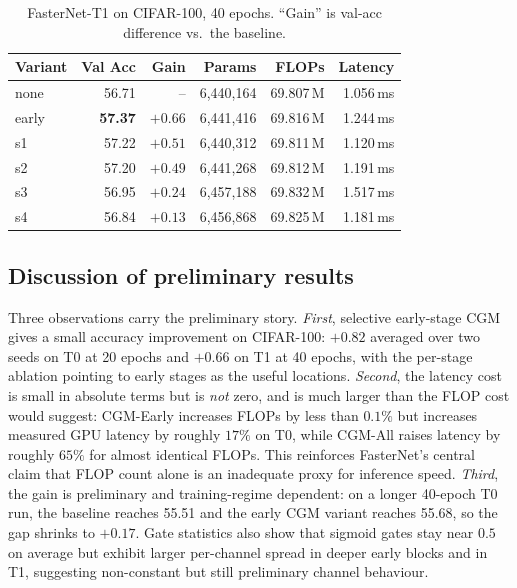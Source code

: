 \documentclass{article}
\begin{document}
\begin{table}[t]
\caption{FasterNet-T1 on CIFAR-100, 40 epochs. ``Gain'' is val-acc difference vs.\ the baseline.}
\label{tab:t1}
\centering
\small
\begin{tabular}{lrrrrr}
\toprule
Variant & Val Acc & Gain & Params & FLOPs & Latency \\
\midrule
none                    & 56.71 & --    & 6{,}440{,}164 & 69.807\,M & 1.056\,ms \\
early & \textbf{57.37} & $+0.66$ & 6{,}441{,}416 & 69.816\,M & 1.244\,ms \\
s1    & 57.22 & $+0.51$ & 6{,}440{,}312 & 69.811\,M & 1.120\,ms \\
s2    & 57.20 & $+0.49$ & 6{,}441{,}268 & 69.812\,M & 1.191\,ms \\
s3    & 56.95 & $+0.24$ & 6{,}457{,}188 & 69.832\,M & 1.517\,ms \\
s4    & 56.84 & $+0.13$ & 6{,}456{,}868 & 69.825\,M & 1.181\,ms \\
\bottomrule
\end{tabular}
\end{table}

\subsection{Discussion of preliminary results}

Three observations carry the preliminary story. \emph{First}, selective early-stage CGM gives a small accuracy improvement on CIFAR-100: $+0.82$ averaged over two seeds on T0 at 20 epochs and $+0.66$ on T1 at 40 epochs, with the per-stage ablation pointing to early stages as the useful locations. \emph{Second}, the latency cost is small in absolute terms but is \emph{not} zero, and is much larger than the FLOP cost would suggest: CGM-Early increases FLOPs by less than $0.1\%$ but increases measured GPU latency by roughly $17\%$ on T0, while CGM-All raises latency by roughly $65\%$ for almost identical FLOPs. This reinforces FasterNet's central claim that FLOP count alone is an inadequate proxy for inference speed. \emph{Third}, the gain is preliminary and training-regime dependent: on a longer 40-epoch T0 run, the baseline reaches 55.51 and the early CGM variant reaches 55.68, so the gap shrinks to $+0.17$. Gate statistics also show that sigmoid gates stay near $0.5$ on average but exhibit larger per-channel spread in deeper early blocks and in T1, suggesting non-constant but still preliminary channel behaviour.
\end{document}
